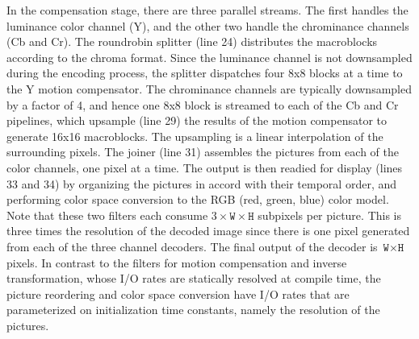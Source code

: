 In the compensation stage, there are three parallel streams.  The
first handles the luminance color channel (Y), and the other two
handle the chrominance channels (Cb and Cr). The roundrobin splitter
(line 24) distributes the macroblocks according to the chroma
format. Since the luminance channel is not downsampled during the
encoding process, the splitter dispatches four 8x8 blocks at a time to
the Y motion compensator. The chrominance channels are typically
downsampled by a factor of 4, and hence one 8x8 block is streamed to
each of the Cb and Cr pipelines, which upsample (line 29) the results
of the motion compensator to generate 16x16 macroblocks.  The
upsampling is a linear interpolation of the surrounding pixels.
The joiner (line 31) assembles the pictures from each of the color
channels, one pixel at a time.  The output is then readied for display
(lines 33 and 34) by organizing the pictures in accord with their
temporal order, and performing color space conversion to the RGB (red,
green, blue) color model. Note that these two filters each consume
$3\times\texttt{W}\times\texttt{H}$ subpixels per picture. This is
three times the resolution of the decoded image since there is
one pixel generated from each of the three channel decoders. The final
output of the decoder is $\texttt{W}\times\texttt{H}$ pixels.  In
contrast to the filters for motion compensation and inverse transformation,
whose I/O rates are statically resolved at compile time, the picture 
reordering and color space conversion have I/O rates that are
parameterized on initialization time constants, namely the 
resolution of the pictures.


